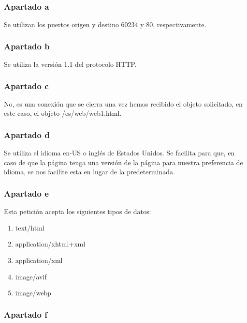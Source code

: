 \documentclass[spanish]{report} %
\begin{document}
\subsubsection{Apartado a}

Se utilizan los puertos origen y destino 60234 y 80, respectivamente.

\subsubsection{Apartado b}

Se utiliza la versión 1.1 del protocolo HTTP.

\subsubsection{Apartado c}

No, es una conexión que se cierra una vez hemos recibido el objeto solicitado,
en este caso, el objeto /es/web/web1.html.

\subsubsection{Apartado d}

Se utiliza el idioma en-US o inglés de Estados Unidos. Se facilita para que, en
caso de que la página tenga una versión de la página para nuestra preferencia de
idioma, se nos facilite esta en lugar de la predeterminada.

\subsubsection{Apartado e}

Esta petición acepta los siguientes tipos de datos:

\begin{enumerate}

\item text/html

\item application/xhtml+xml

\item application/xml

\item image/avif

\item image/webp

\end{enumerate}

\subsubsection{Apartado f}
\end{document}
